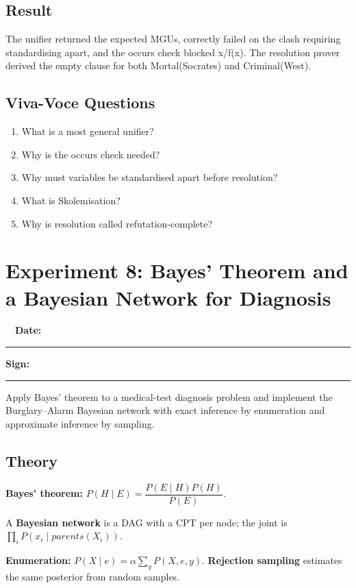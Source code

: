 \documentclass[11pt]{article}
\begin{document}
\subsection*{Result}
\begin{outcome}The unifier returned the expected MGUs, correctly failed on the clash requiring standardising apart, and the occurs check blocked x/f(x). The resolution prover derived the empty clause for both Mortal(Socrates) and Criminal(West).\end{outcome}
\subsection*{Viva-Voce Questions}
\begin{enumerate}
\item What is a most general unifier?
\item Why is the occurs check needed?
\item Why must variables be standardised apart before resolution?
\item What is Skolemisation?
\item Why is resolution called refutation-complete?
\end{enumerate}
\newpage
\section*{Experiment 8: Bayes' Theorem and a Bayesian Network for Diagnosis}\label{exp8}
\noindent{}\ \ \hfill\textbf{\color{navy}Date:}\ \rule{3cm}{0.4pt}\quad\textbf{\color{navy}Sign:}\ \rule{3cm}{0.4pt}\par\medskip
\begin{keypoint}[Aim]Apply Bayes' theorem to a medical-test diagnosis problem and implement the Burglary--Alarm Bayesian network with exact inference by enumeration and approximate inference by sampling.\end{keypoint}
\subsection*{Theory}
\textbf{Bayes' theorem:} $P(H\mid E)=\dfrac{P(E\mid H)P(H)}{P(E)}$.

A \textbf{Bayesian network} is a DAG with a CPT per node; the joint is $\prod_i P(x_i\mid parents(X_i))$.

\textbf{Enumeration:} $P(X\mid e)=\alpha\sum_y P(X,e,y)$. \textbf{Rejection sampling} estimates the same posterior from random samples.
\end{document}
